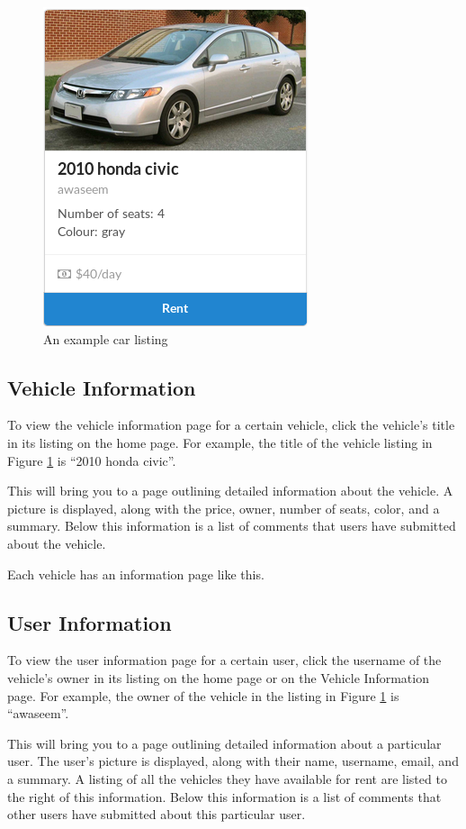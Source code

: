 \documentclass{article}
\begin{document}
\begin{figure}[ht!]
    \centering
    \includegraphics[keepaspectratio, scale=0.5]{carcard}
    \caption{An example car listing}
    \label{fig:carcard}
\end{figure}

\subsection{Vehicle Information}
To view the vehicle information page for a certain vehicle, click the vehicle's title in its listing on the home page. For example, the title of the vehicle listing in Figure \ref{fig:carcard} is ``2010 honda civic''.

This will bring you to a page outlining detailed information about the vehicle. A picture is displayed, along with the price, owner, number of seats, color, and a summary. Below this information is a list of comments that users have submitted about the vehicle.

Each vehicle has an information page like this.

\subsection{User Information}
To view the user information page for a certain user, click the username of the vehicle's owner in its listing on the home page or on the Vehicle Information page. For example, the owner of the vehicle in the listing in Figure \ref{fig:carcard} is ``awaseem''.

This will bring you to a page outlining detailed information about a particular user. The user's picture is displayed, along with their name, username, email, and a summary. A listing of all the vehicles they have available for rent are listed to the right of this information. Below this information is a list of comments that other users have submitted about this particular user.
\end{document}
